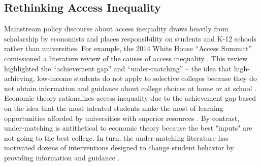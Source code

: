 \documentclass[twoside]{article}
\begin{document}
\subsection*{Rethinking Access Inequality}

Mainstream policy discourse about access inequality draws heavily from scholarship by economists and places responsibility on students and K-12 schools rather than universities. For example, the 2014 White House ``Access Summitt'' comissioned a literature review of the causes of access inequality \citep{RN4016}.  This review highlighted the ``achievement gap'' and ``under-matching'' -- the idea that high-achieving, low-income students do not apply to selective colleges because they do not obtain information and guidance about college choices at home or at school \citep{RN3699,RN3700}.  Economic theory rationalizes access inequality due to the achievement gap based on the idea that the most talented students make the most of learning opportunities afforded by universities with superior resources \citep{RN1549,RN2247,RN2402,RN1545}. By contrast, under-matching is antithetical to economic theory because the best "inputs" are not going to the best college. In turn, the under-matching literature has motivated dozens of interventions designed to change student behavior by providing information and guidance \citep[e.g., ][]{RN4352,RN4345,RN4351}.  
\end{document}
